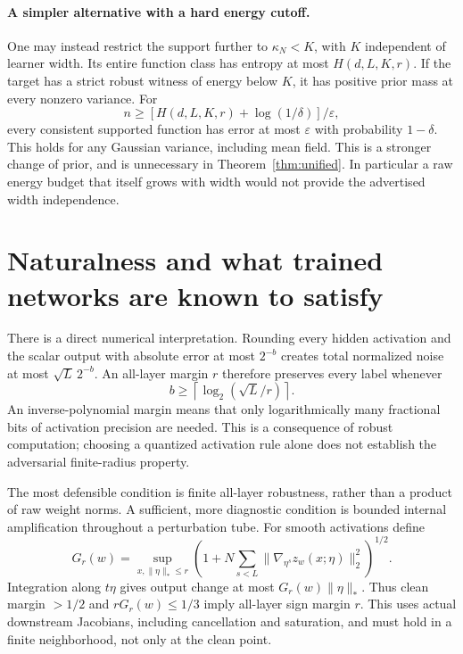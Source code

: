 \documentclass[11pt]{article}
\begin{document}
\paragraph{A simpler alternative with a hard energy cutoff.}
One may instead restrict the support further to
$\kappa_N<K$, with $K$ independent of learner width. Its entire function
class has entropy at most $H(d,L,K,r)$. If the target has a strict robust
witness of energy below $K$, it has positive prior mass at every nonzero
variance. For
\[
 n\ge[H(d,L,K,r)+\log(1/\delta)]/\varepsilon,
\]
every consistent supported function has error at most $\varepsilon$ with
probability $1-\delta$. This holds for any Gaussian variance, including
mean field. This is a stronger change of prior, and is unnecessary in
Theorem~\ref{thm:unified}. In particular a raw energy budget
that itself grows with width would not provide the advertised width independence.



\section{Naturalness and what trained networks are known to satisfy}

There is a direct numerical interpretation. Rounding every hidden activation
and the scalar output with absolute error at most $2^{-b}$ creates total
normalized noise at most $\sqrt L\,2^{-b}$. An all-layer margin $r$ therefore
preserves every label whenever
\[
 b\ge\left\lceil\log_2(\sqrt L/r)\right\rceil.
\]
An inverse-polynomial margin means that only logarithmically many fractional
bits of activation precision are needed. This is a consequence of robust
computation; choosing a quantized activation rule alone does not establish
the adversarial finite-radius property.

The most defensible condition is finite all-layer robustness, rather than
a product of raw weight norms. A sufficient, more diagnostic condition is
bounded internal amplification throughout a perturbation tube. For smooth
activations define
\[
 G_r(w)=\sup_{x,\|\eta\|_*\le r}
 \left(1+N\sum_{s<L}\|\nabla_{\eta^s}z_w(x;\eta)\|_2^2\right)^{1/2}.
\]
Integration along $t\eta$ gives output change at most $G_r(w)\|\eta\|_*$.
Thus clean margin $>1/2$ and $rG_r(w)\le1/3$ imply all-layer sign margin $r$.
This uses actual downstream Jacobians, including cancellation and saturation,
and must hold in a finite neighborhood, not only at the clean point.
\end{document}
